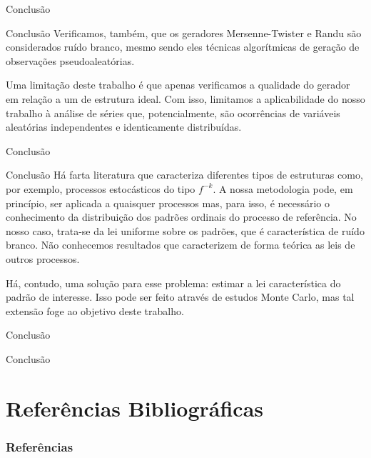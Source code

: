 \documentclass[10pt,xcolor={dvipsnames}]{beamer}
\begin{document}
\begin{frame}{Conclusão}{}
	\begin{block}{Conclusão}
	Verificamos, também, que os geradores Mersenne-Twister e Randu são considerados ruído branco, mesmo sendo eles técnicas algorítmicas de geração de observações pseudoaleatórias.
	\pause
	
	Uma limitação deste trabalho é que apenas verificamos a qualidade do gerador em relação a um de estrutura ideal.
	Com isso, limitamos a aplicabilidade do nosso trabalho à análise de séries que, potencialmente, são ocorrências de variáveis aleatórias independentes e identicamente distribuídas.	
	\end{block}
\end{frame}

\begin{frame}{Conclusão}{}
	\begin{block}{Conclusão}
	Há farta literatura que caracteriza diferentes tipos de estruturas como, por exemplo, processos estocásticos do tipo $f^{-k}$.
	A nossa metodologia pode, em princípio, ser aplicada a quaisquer processos mas, para isso, é necessário o conhecimento da distribuição dos padrões ordinais do processo de referência.
	No nosso caso, trata-se da lei uniforme sobre os padrões, que é característica de ruído branco.
	Não conhecemos resultados que caracterizem de forma teórica as leis de outros processos.
	\pause
	
	Há, contudo, uma solução para esse problema: estimar a lei característica do padrão de interesse.
	Isso pode ser feito através de estudos Monte Carlo, mas tal extensão foge ao objetivo deste trabalho.
	\end{block}
\end{frame}

\begin{frame}{Conclusão}{}
	\begin{block}{Conclusão}
		
	\end{block}
\end{frame}

\section{Referências Bibliográficas}
\begin{frame}[allowframebreaks]
	\frametitle{Referências}
%	
%	
	
\end{frame}

{\1
\begin{frame}
\end{frame}}
\end{document}

